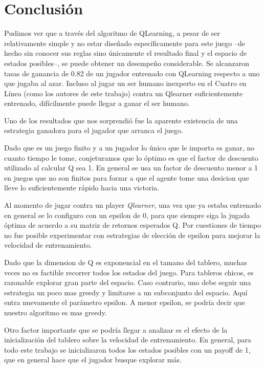 \documentclass[10pt,a4paper]{article}
\begin{document}
\section{Conclusión}

Pudimos ver que a través del algoritmo de QLearning, a pesar de ser relativamente simple y no estar diseñado específicamente para este juego --de hecho sin conocer sus reglas sino únicamente el resultado final y el espacio de estados posibles--, se puede obtener un desempeño considerable. Se alcanzaron tasas de ganancia de 0.82 de un jugador entrenado con QLearning respecto a uno que jugaba al azar. Incluso al jugar un ser humano inexperto en el Cuatro en Línea (como los autores de este trabajo) contra un Qlearner suficientemente entrenado, difícilmente puede llegar a ganar el ser humano.

Uno de los resultados que nos sorprendió fue la aparente existencia de una estrategia ganadora para el jugador que arranca el juego.

Dado que es un juego finito y a un jugador lo único que le importa es ganar, no cuanto tiempo le tome, conjeturamos que lo óptimo es que el factor de descuento utilizado al calcular Q sea 1. En general se usa un factor de descuento menor a 1 en juegos que no son finitos para forzar a que el agente tome una desicion que lleve lo suficientemente rápido hacia una victoria.

Al momento de jugar contra un player \textit{Qlearner}, una vez que ya estaba entrenado en general se lo configuro con un epsilon de 0, para que siempre siga la jugada óptima de acuerdo a su matriz de retornos esperados Q. Por cuestiones de tiempo no fue posible experimentar con estrategias de elección de epsilon para mejorar la velocidad de entrenamiento.

Dado que la dimension de Q es exponencial en el tamano del tablero, muchas veces no es factible recorrer todos los estados del juego. Para tableros chicos, es razonable explorar gran parte del espacio. Caso contrario, uno debe seguir una estrategia un poco mas greedy y limitarse a un subconjunto del espacio. Aquí entra nuevamente el parámetro epsilon. A menor epsilon, se podría decir que nuestro algoritmo es mas greedy.

Otro factor importante que se podría llegar a analizar es el efecto de la inicialización del tablero sobre la velocidad de entrenamiento. En general, para todo este trabajo se inicializaron todos los estados posibles con un payoff de 1, que en general hace que el jugador busque explorar más.
\end{document}
